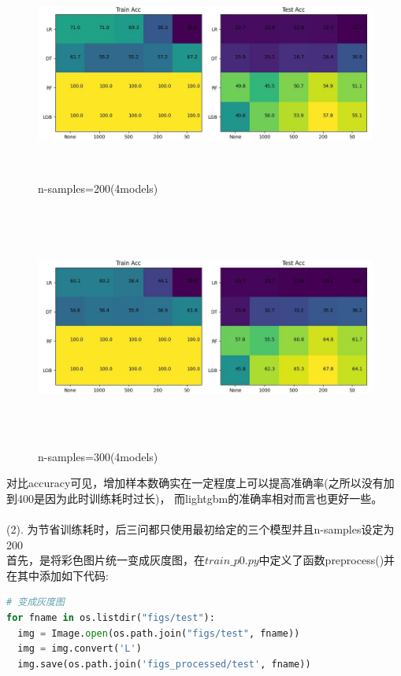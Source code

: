 \documentclass[answers]{exam}  %
\begin{document}
\begin{questions}
	\begin{figure}[h]
		\centering
		\includegraphics[width=15cm,height=7cm]{problem2-code/200-color(4models).jpg}
		\caption{n-samples=200(4models)}
	\end{figure}
	\newpage
	\begin{figure}[h]
		\centering
		\includegraphics[width=15cm,height=8cm]{problem2-code/300-color(4models).jpg}
		\caption{n-samples=300(4models)}
	\end{figure}
	对比accuracy可见，增加样本数确实在一定程度上可以提高准确率(之所以没有加到400是因为此时训练耗时过长)，
	而lightgbm的准确率相对而言也更好一些。\\
	~\\
	(2). 为节省训练耗时，后三问都只使用最初给定的三个模型并且n-samples设定为200\\
	首先，是将彩色图片统一变成灰度图，在$train\_p0.py$中定义了函数preprocess()并在其中添加如下代码:
	\begin{lstlisting}[language={Python}]
# 变成灰度图
for fname in os.listdir("figs/test"):
  img = Image.open(os.path.join("figs/test", fname))
  img = img.convert('L')
  img.save(os.path.join('figs_processed/test', fname))

\end{lstlisting}
\end{questions}
\end{document}
